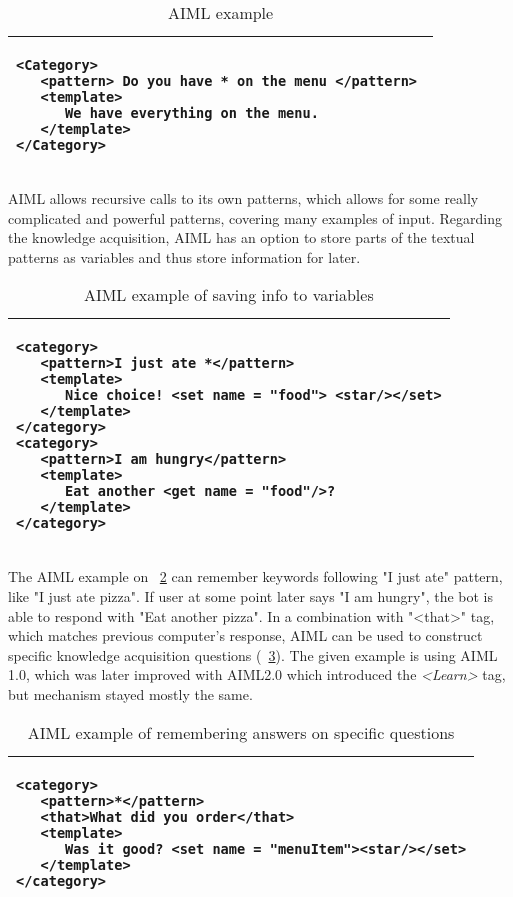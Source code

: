 \begin{table}[htb]
\caption{AIML example}
\label{tab:aiml_example}
\centering
\begin{tabular}{l}
\hline
\lstset{language=XML,breaklines=true}
\begin{lstlisting}
<Category> 
   <pattern> Do you have * on the menu </pattern> 
   <template>
      We have everything on the menu.
   </template> 
</Category>
\end{lstlisting}  \\
\hline
\end{tabular}
\end{table}

AIML allows recursive calls to its own patterns, which allows for some really 
complicated
and powerful patterns, covering many examples of input. Regarding the knowledge 
acquisition,
AIML has an option to store parts of the textual patterns as variables and thus 
store 
information for later. 

\begin{table}[htb]
	\caption{AIML example of saving info to variables}
	\label{tab:aiml_ka1}
	\centering
	\begin{tabular}{l}
		\hline
		\lstset{language=XML,breaklines=true}
		\begin{lstlisting}
<category>
   <pattern>I just ate *</pattern>
   <template>
      Nice choice! <set name = "food"> <star/></set>
   </template>  
</category>  
<category>
   <pattern>I am hungry</pattern>
   <template>
      Eat another <get name = "food"/>?
   </template>  
</category> 
		\end{lstlisting}  \\
		\hline
	\end{tabular}
\end{table}

The AIML example on \tablename~\ref{tab:aiml_ka1} can remember keywords
following "I just ate" pattern, like "I just ate pizza". If user at some point 
later says "I am hungry", the bot is able to respond with "Eat another pizza". 
In a combination with "<that>" tag, which matches previous computer's response, 
AIML can be used to construct specific knowledge acquisition questions 
(\tablename~\ref{tab:aiml_ka2}).  The given example is using AIML 1.0, which
was later improved with AIML2.0\parencite{Wallace2013} which introduced the
\emph{<Learn>} tag, but mechanism stayed mostly the same.

\begin{table}[htb]
	\caption{AIML example of remembering answers on specific questions}
	\label{tab:aiml_ka2}
	\centering
	\begin{tabular}{l}
		\hline
		\lstset{language=XML,breaklines=true}
		\begin{lstlisting}
<category>
   <pattern>*</pattern>
   <that>What did you order</that>
   <template> 
      Was it good? <set name = "menuItem"><star/></set>
   </template>  
</category>  
		\end{lstlisting}  \\
		\hline
	\end{tabular}
\end{table}

